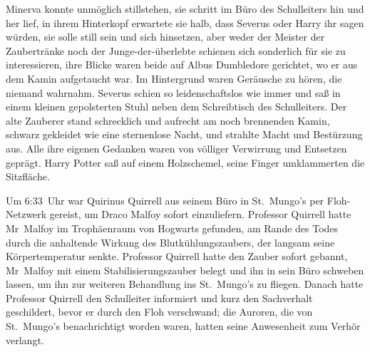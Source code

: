 Minerva konnte unmöglich stillstehen, sie schritt im Büro des Schulleiters hin und her lief, in ihrem Hinterkopf erwartete sie halb, dass Severus oder Harry ihr sagen würden, sie solle still sein und sich hinsetzen, aber weder der Meister der Zaubertränke noch der Junge-der-überlebte schienen sich sonderlich für sie zu interessieren, ihre Blicke waren beide auf Albus Dumbledore gerichtet, wo er aus dem Kamin aufgetaucht war. Im Hintergrund waren Geräusche zu hören, die niemand wahrnahm. Severus schien so leidenschaftslos wie immer und saß in einem kleinen gepolsterten Stuhl neben dem Schreibtisch des Schulleiters.
Der alte Zauberer stand schrecklich und aufrecht am noch brennenden Kamin, schwarz gekleidet wie eine sternenlose Nacht, und strahlte Macht und Bestürzung aus. Alle ihre eigenen Gedanken waren von völliger Verwirrung und Entsetzen geprägt. Harry Potter saß auf einem Holzschemel, seine Finger umklammerten die Sitzfläche.

Um 6:33~Uhr war Quirinus Quirrell aus seinem Büro in St.~Mungo’s per Floh-Netzwerk gereist, um Draco Malfoy sofort einzuliefern. Professor Quirrell hatte Mr~Malfoy im Trophäenraum von Hogwarts gefunden, am Rande des Todes durch die anhaltende Wirkung des Blutkühlungszaubers, der langsam seine Körpertemperatur senkte. Professor Quirrell hatte den Zauber sofort gebannt, Mr~Malfoy mit einem Stabilisierungszauber belegt und ihn in sein Büro schweben lassen, um ihn zur weiteren Behandlung ins St.~Mungo’s zu fliegen. Danach hatte Professor Quirrell den Schulleiter informiert und kurz den Sachverhalt geschildert, bevor er durch den Floh verschwand; die Auroren, die von St.~Mungo’s benachrichtigt worden waren, hatten seine Anwesenheit zum Verhör verlangt.

